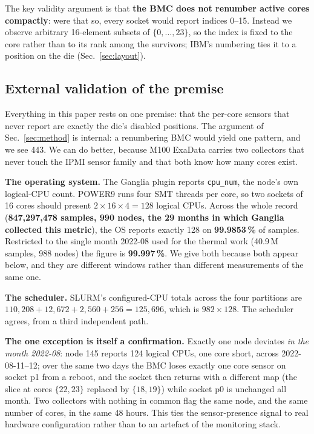 \documentclass[10pt,conference]{IEEEtran}
\begin{document}
The key validity argument is that \textbf{the BMC does not renumber active cores compactly}: were
that so, every socket would report indices 0--15. Instead we observe arbitrary 16-element subsets
of $\{0,\dots,23\}$, so the index is fixed to the core rather than to its rank among the
survivors; IBM's numbering ties it to a position on the die (Sec.~\ref{sec:layout}).

\subsection{External validation of the premise}
\label{sec:groundtruth}
Everything in this paper rests on one premise: that the per-core sensors that never report are
exactly the die's disabled positions. The argument of Sec.~\ref{sec:method} is internal: a renumbering BMC would
yield one pattern, and we see 443. We can do better, because M100 ExaData carries two collectors
that never touch the IPMI sensor family and that both know how many cores exist.

\textbf{The operating system.} The Ganglia plugin reports \texttt{cpu\_num}, the node's own
logical-CPU count. POWER9 runs four SMT threads per core, so two sockets of 16 cores should present
$2\times16\times4=128$ logical CPUs. Across the whole record (\textbf{847{,}297{,}478 samples,
990 nodes, the 29 months in which Ganglia collected this metric}), the OS reports exactly 128 on
\textbf{99.9853\,\%} of samples. Restricted to the single month 2022-08 used for the thermal work
(40.9\,M samples, 988 nodes) the figure is \textbf{99.997\,\%}. We give both because both appear
below, and they are different windows rather than different measurements of the same one.

\textbf{The scheduler.} SLURM's configured-CPU totals across the four partitions are
$110{,}208+12{,}672+2{,}560+256=125{,}696$, which is $982\times128$. The scheduler agrees, from a
third independent path.

\textbf{The one exception is itself a confirmation.} Exactly one node deviates \emph{in the month
2022-08}: node 145 reports 124 logical CPUs, one core short, across 2022-08-11--12; over the
same two days the BMC loses exactly one core sensor on socket p1 from a reboot, and the socket then
returns with a different map (the slice at cores $\{22,23\}$ replaced by $\{18,19\}$) while socket
p0 is unchanged all month. Two collectors with nothing in common flag the same node, and the same
number of cores, in the same 48 hours. This ties the sensor-presence signal to real
hardware configuration rather than to an artefact of the monitoring stack.
\end{document}

